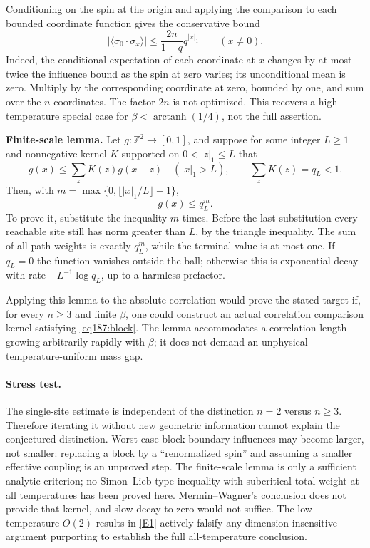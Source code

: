 \documentclass[11pt,a4paper]{article}
\newcommand{\Z}{\mathbb{Z}}
\newcommand{\eref}[2]{\hyperlink{extra:#1:#2}{[E#2]}}
\numberwithin{equation}{section}
\begin{document}
Conditioning on the spin at the origin and applying the comparison to each bounded coordinate function gives the conservative bound
\begin{equation}\label{eq187:highT}
 |\langle\sigma_0\cdot\sigma_x\rangle|
 \le \frac{2n}{1-q}q^{|x|_1}\qquad(x\ne0).
\end{equation}
Indeed, the conditional expectation of each coordinate at $x$ changes by at most twice the influence bound as the spin at zero varies; its unconditional mean is zero. Multiply by the corresponding coordinate at zero, bounded by one, and sum over the $n$ coordinates. The factor $2n$ is not optimized. This recovers a high-temperature special case for $\beta<\operatorname{arctanh}(1/4)$, not the full assertion.

\textbf{Finite-scale lemma.} Let $g:\Z^2\to[0,1]$, and suppose for some integer $L\ge1$ and nonnegative kernel $K$ supported on $0<|z|_1\le L$ that
\begin{equation}\label{eq187:block}
 g(x)\le\sum_zK(z)g(x-z)\quad(|x|_1>L),\qquad
 \sum_zK(z)=q_L<1.
\end{equation}
Then, with $m=\max\{0,\lfloor |x|_1/L\rfloor-1\}$,
\[
 g(x)\le q_L^m.
\]
To prove it, substitute the inequality $m$ times. Before the last substitution every reachable site still has norm greater than $L$, by the triangle inequality. The sum of all path weights is exactly $q_L^m$, while the terminal value is at most one. If $q_L=0$ the function vanishes outside the ball; otherwise this is exponential decay with rate $-L^{-1}\log q_L$, up to a harmless prefactor.

Applying this lemma to the absolute correlation would prove the stated target if, for every $n\ge3$ and finite $\beta$, one could construct an actual correlation comparison kernel satisfying \eqref{eq187:block}. The lemma accommodates a correlation length growing arbitrarily rapidly with $\beta$; it does not demand an unphysical temperature-uniform mass gap.

\paragraph{Stress test.}
The single-site estimate is independent of the distinction $n=2$ versus $n\ge3$. Therefore iterating it without new geometric information cannot explain the conjectured distinction. Worst-case block boundary influences may become larger, not smaller: replacing a block by a ``renormalized spin'' and assuming a smaller effective coupling is an unproved step. The finite-scale lemma is only a sufficient analytic criterion; no Simon--Lieb-type inequality with subcritical total weight at all temperatures has been proved here. Mermin--Wagner's conclusion does not provide that kernel, and slow decay to zero would not suffice. The low-temperature $O(2)$ results in \eref{statement}{1} actively falsify any dimension-insensitive argument purporting to establish the full all-temperature conclusion.
\end{document}
